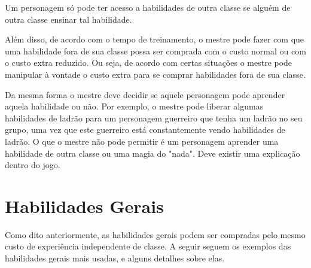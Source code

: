 Um personagem só pode ter acesso a habilidades de outra classe se alguém de outra classe ensinar tal habilidade.

Além disso, de acordo com o tempo de treinamento, o mestre pode fazer com que uma habilidade fora de sua classe possa ser comprada com o custo normal ou com o custo extra reduzido. Ou seja, de acordo com certas situações o mestre pode manipular à vontade o custo extra para se comprar habilidades fora de sua classe.

Da mesma forma o mestre deve decidir se aquele personagem pode aprender aquela habilidade ou não. Por exemplo, o mestre pode liberar algumas habilidades de ladrão para um personagem guerreiro que tenha um ladrão no seu grupo, uma vez que este guerreiro está constantemente vendo habilidades de ladrão. O que o mestre não pode permitir é um personagem aprender uma habilidade de outra classe ou uma magia do "nada". Deve existir uma explicação dentro do jogo.

\section{Habilidades Gerais}

Como dito anteriormente, as habilidades gerais podem ser compradas pelo mesmo custo de experiência independente de classe. A seguir seguem os exemplos das habilidades gerais mais usadas, e alguns detalhes sobre elas. 


